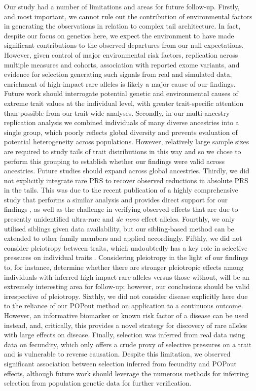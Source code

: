 \documentclass[12pt]{zHenriquesLab-StyleBioRxiv}
\begin{document}
Our study had a number of limitations and areas for future follow-up. 
Firstly, and most important, we cannot rule out the contribution of 
environmental factors in generating the observations in relation to 
complex tail architecture. In fact, despite our focus on genetics 
here, we expect the environment to have made significant contributions 
to the observed departures from our null expectations. However, 
given control of major environmental risk factors, replication across 
multiple measures and cohorts, association with reported exome variants, 
and evidence for selection generating such signals from real and simulated data, 
enrichment of high-impact rare alleles is likely a major cause of our findings. 
Future work should interrogate potential genetic and environmental causes of extreme 
trait values at the individual level, with greater trait-specific attention than possible 
from our trait-wide analyses. Secondly, in our multi-ancestry replication analysis we 
combined individuals of many diverse ancestries into a single group, which poorly 
reflects global diversity and prevents evaluation of potential heterogeneity across 
populations. However, relatively large sample sizes are required to study tails of trait distributions in this 
way and so we chose to perform this grouping to establish whether our 
findings were valid across ancestries. Future studies should expand across global ancestries. 
Thirdly, we did not explicitly integrate rare PRS to recover observed reductions 
in absolute PRS in the tails. This was due to the recent publication of a highly comprehensive 
study that performs a similar analysis and provides direct support for our findings \cite{Fiziev2023}, 
as well as the challenge in verifying observed effects that are due to 
presently unidentified ultra-rare and  \emph{de novo} effect alleles. 
Fourthly, we only utilised siblings given data availability, but our
sibling-based method can be extended to other family members \cite{Souaiaia2024}
and applied accordingly. Fifthly, we did not consider pleiotropy between 
traits, which undoubtedly has a key role in selective pressures on individual traits \cite{Barghi2020}. 
Considering pleiotropy in the light of our findings to, for instance, determine 
whether there are stronger pleiotropic effects among individuals with 
inferred high-impact rare alleles versus those without, will be an extremely 
interesting area for follow-up; however, our conclusions should be valid 
irrespective of pleiotropy. Sixthly, we did not consider disease explicitly 
here due to the reliance of our POPout method on application to a continuous outcome. 
However, an informative biomarker or known risk factor of a 
disease can be used instead, and, critically, this provides a novel strategy 
for discovery of rare alleles with large effects on disease. 
Finally, selection was inferred from real data using data on fecundity, 
which only offers a crude proxy of selective pressures on a trait and 
is vulnerable to reverse causation. Despite this limitation, 
we observed significant association between selection inferred 
from fecundity and POPout effects, although future work should leverage 
the numerous methods for inferring selection from population genetic data for further verification. 
\end{document}
